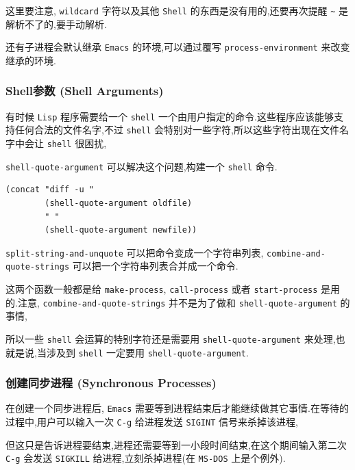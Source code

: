 \documentclass[11pt]{article}
\begin{document}
这里要注意, \texttt{wildcard} 字符以及其他 \texttt{Shell} 的东西是没有用的,还要再次提醒 \texttt{\textasciitilde{}} 是解析不了的,要手动解析.

还有子进程会默认继承 \texttt{Emacs} 的环境,可以通过覆写 \texttt{process-environment} 来改变继承的环境.




\subsubsection{Shell参数 (Shell Arguments)}
\label{sec:orgb335835}

有时候 \texttt{Lisp} 程序需要给一个 \texttt{shell} 一个由用户指定的命令.这些程序应该能够支持任何合法的文件名字,不过 \texttt{shell} 会特别对一些字符,所以这些字符出现在文件名字中会让 \texttt{shell} 很困扰,

\texttt{shell-quote-argument} 可以解决这个问题,构建一个 \texttt{shell} 命令.

\begin{verbatim}
(concat "diff -u "
        (shell-quote-argument oldfile)
        " "
        (shell-quote-argument newfile))
\end{verbatim}

\texttt{split-string-and-unquote} 可以把命令变成一个字符串列表, \texttt{combine-and-quote-strings} 可以把一个字符串列表合并成一个命令.

这两个函数一般都是给 \texttt{make-process}, \texttt{call-process} 或者 \texttt{start-process} 是用的.注意,  \texttt{combine-and-quote-strings} 并不是为了做和 \texttt{shell-quote-argument} 的事情,

所以一些 \texttt{shell} 会运算的特别字符还是需要用 \texttt{shell-quote-argument} 来处理,也就是说,当涉及到 \texttt{shell} 一定要用 \texttt{shell-quote-argument}.




\subsubsection{创建同步进程 (Synchronous Processes)}
\label{sec:org1299536}

在创建一个同步进程后, \texttt{Emacs} 需要等到进程结束后才能继续做其它事情.在等待的过程中,用户可以输入一次 \texttt{C-g} 给进程发送 \texttt{SIGINT} 信号来杀掉该进程,

但这只是告诉进程要结束,进程还需要等到一小段时间结束,在这个期间输入第二次 \texttt{C-g} 会发送 \texttt{SIGKILL} 给进程,立刻杀掉进程(在 \texttt{MS-DOS} 上是个例外).
\end{document}
